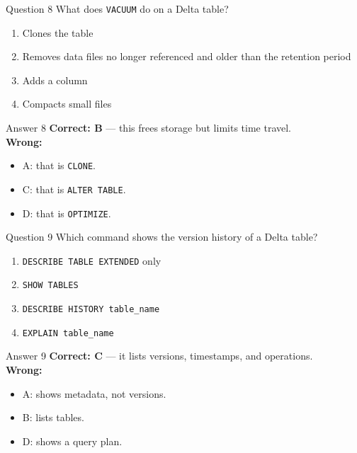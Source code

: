 \documentclass[aspectratio=169,11pt]{beamer}
\begin{document}
\begin{frame}{Question 8}
What does \texttt{VACUUM} do on a Delta table?
\begin{enumerate}[label=\Alph*.]
\item Clones the table
\item Removes data files no longer referenced and older than the retention period
\item Adds a column
\item Compacts small files
\end{enumerate}
\end{frame}
\begin{frame}{Answer 8}
\textbf{Correct: B} --- this frees storage but limits time travel.\\
\vspace{0.5em}
\textbf{Wrong:}
\begin{itemize}
\item A: that is \texttt{CLONE}.
\item C: that is \texttt{ALTER TABLE}.
\item D: that is \texttt{OPTIMIZE}.
\end{itemize}
\end{frame}

\begin{frame}{Question 9}
Which command shows the version history of a Delta table?
\begin{enumerate}[label=\Alph*.]
\item \texttt{DESCRIBE TABLE EXTENDED} only
\item \texttt{SHOW TABLES}
\item \texttt{DESCRIBE HISTORY table\_name}
\item \texttt{EXPLAIN table\_name}
\end{enumerate}
\end{frame}
\begin{frame}{Answer 9}
\textbf{Correct: C} --- it lists versions, timestamps, and operations.\\
\vspace{0.5em}
\textbf{Wrong:}
\begin{itemize}
\item A: shows metadata, not versions.
\item B: lists tables.
\item D: shows a query plan.
\end{itemize}
\end{frame}
\end{document}
